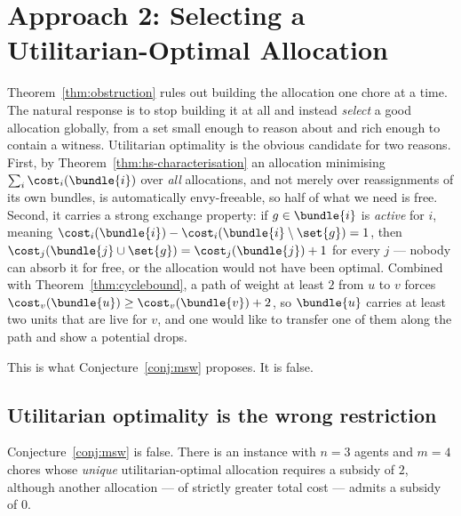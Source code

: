 \section{Approach 2: Selecting a Utilitarian-Optimal Allocation}
\label{sec:approach2}

Theorem~\ref{thm:obstruction} rules out building the allocation one chore at a
time. The natural response is to stop building it at all and instead
\emph{select} a good allocation globally, from a set small enough to reason
about and rich enough to contain a witness. Utilitarian optimality is the
obvious candidate for two reasons. First, by
Theorem~\ref{thm:hs-characterisation} an allocation minimising $\sum_i
\cost_i(\bundle{i})$ over \emph{all} allocations, and not merely over
reassignments of its own bundles, is automatically envy-freeable, so half of
what we need is free. Second, it carries a strong exchange property: if
$g \in \bundle{i}$ is \emph{active} for $i$, meaning
$\cost_i(\bundle{i}) - \cost_i(\bundle{i} \setminus \set{g}) = 1$, then
$\cost_j(\bundle{j} \cup \set{g}) = \cost_j(\bundle{j}) + 1$ for every $j$ ---
nobody can absorb it for free, or the allocation would not have been optimal.
Combined with Theorem~\ref{thm:cyclebound}, a path of weight at least $2$ from
$u$ to $v$ forces $\cost_v(\bundle{u}) \ge \cost_v(\bundle{v}) + 2$, so
$\bundle{u}$ carries at least two units that are live for $v$, and one would
like to transfer one of them along the path and show a potential drops.

This is what Conjecture~\ref{conj:msw} proposes. It is false.

\subsection{Utilitarian optimality is the wrong restriction}

\begin{proposition}
\label{prop:msw-false}
Conjecture~\ref{conj:msw} is false. There is an instance with $n = 3$ agents and
$m = 4$ chores whose \emph{unique} utilitarian-optimal allocation requires a
subsidy of $2$, although another allocation --- of strictly greater total cost
--- admits a subsidy of $0$.
\end{proposition}

